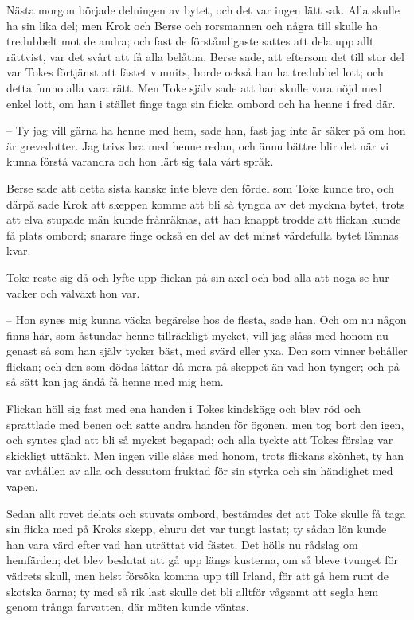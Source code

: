 \initial Nästa morgon började delningen av bytet, och det var ingen lätt sak. Alla skulle ha sin lika del; men Krok och Berse och rorsmannen och några till skulle ha tredubbelt mot de andra; och fast de förståndigaste sattes att dela upp allt rättvist, var det svårt att få alla belåtna. Berse sade, att eftersom det till stor del var Tokes förtjänst att fästet vunnits, borde också han ha tredubbel lott; och detta funno alla vara rätt. Men Toke själv sade att han skulle vara nöjd med enkel lott, om han i stället finge taga sin flicka ombord och ha henne i fred där.

– Ty jag vill gärna ha henne med hem, sade han, fast jag inte är säker på om hon är grevedotter. Jag trivs bra med henne redan, och ännu bättre blir det när vi kunna förstå varandra och hon lärt sig tala vårt språk.

\initial Berse sade att detta sista kanske inte bleve den fördel som Toke kunde tro, och därpå sade Krok att skeppen komme att bli så tyngda av det myckna bytet, trots att elva stupade män kunde frånräknas, att han knappt trodde att flickan kunde få plats ombord; snarare finge också en del av det minst värdefulla bytet lämnas kvar.

\initial Toke reste sig då och lyfte upp flickan på sin axel och bad alla att noga se hur vacker och välväxt hon var.

– Hon synes mig kunna väcka begärelse hos de flesta, sade han. Och om nu någon finns här, som åstundar henne tillräckligt mycket, vill jag slåss med honom nu genast så som han själv tycker bäst, med svärd eller yxa. Den som vinner behåller flickan; och den som dödas lättar då mera på skeppet än vad hon tynger; och på så sätt kan jag ändå få henne med mig hem.

\initial Flickan höll sig fast med ena handen i Tokes kindskägg och blev röd och sprattlade med benen och satte andra handen för ögonen, men tog bort den igen, och syntes glad att bli så mycket begapad; och alla tyckte att Tokes förslag var skickligt uttänkt. Men ingen ville slåss med honom, trots flickans skönhet, ty han var avhållen av alla och dessutom fruktad för sin styrka och sin händighet med vapen.

\initial Sedan allt rovet delats och stuvats ombord, bestämdes det att Toke skulle få taga sin flicka med på Kroks skepp, ehuru det var tungt lastat; ty sådan lön kunde han vara värd efter vad han uträttat vid fästet. Det hölls nu rådslag om hemfärden; det blev beslutat att gå upp längs kusterna, om så bleve tvunget för vädrets skull, men helst försöka komma upp till Irland, för att gå hem runt de skotska öarna; ty med så rik last skulle det bli alltför vågsamt att segla hem genom trånga farvatten, där möten kunde väntas.

